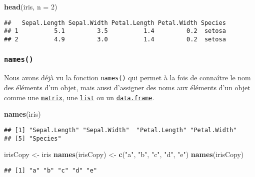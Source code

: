 \documentclass[]{book}
\newenvironment{Shaded}{\begin{snugshade}}{\end{snugshade}}
\newcommand{\KeywordTok}[1]{\textcolor[rgb]{0.13,0.29,0.53}{\textbf{#1}}}
\newcommand{\DataTypeTok}[1]{\textcolor[rgb]{0.13,0.29,0.53}{#1}}
\newcommand{\DecValTok}[1]{\textcolor[rgb]{0.00,0.00,0.81}{#1}}
\newcommand{\StringTok}[1]{\textcolor[rgb]{0.31,0.60,0.02}{#1}}
\newcommand{\NormalTok}[1]{#1}
\theoremstyle{definition}
\theoremstyle{definition}
\theoremstyle{definition}
\theoremstyle{remark}
\begin{document}
\begin{Shaded}
\begin{Highlighting}[]
\KeywordTok{head}\NormalTok{(iris, }\DataTypeTok{n =} \DecValTok{2}\NormalTok{)}
\end{Highlighting}
\end{Shaded}

\begin{verbatim}
##   Sepal.Length Sepal.Width Petal.Length Petal.Width Species
## 1          5.1         3.5          1.4         0.2  setosa
## 2          4.9         3.0          1.4         0.2  setosa
\end{verbatim}

\subsubsection{\texorpdfstring{\texttt{names()}}{names()}}\label{l015names}

Nous avons déjà vu la fonction \texttt{names()} qui permet à la fois de
connaître le nom des éléments d'un objet, mais aussi d'assigner des noms
aux éléments d'un objet comme une
\protect\hyperlink{l014matrix}{\texttt{matrix}}, une
\protect\hyperlink{l014list}{\texttt{list}} ou un
\protect\hyperlink{l014dataframe}{\texttt{data.frame}}.

\begin{Shaded}
\begin{Highlighting}[]
\KeywordTok{names}\NormalTok{(iris)}
\end{Highlighting}
\end{Shaded}

\begin{verbatim}
## [1] "Sepal.Length" "Sepal.Width"  "Petal.Length" "Petal.Width" 
## [5] "Species"
\end{verbatim}

\begin{Shaded}
\begin{Highlighting}[]
\NormalTok{irisCopy <-}\StringTok{ }\NormalTok{iris}
\KeywordTok{names}\NormalTok{(irisCopy) <-}\StringTok{ }\KeywordTok{c}\NormalTok{(}\StringTok{"a"}\NormalTok{, }\StringTok{"b"}\NormalTok{, }\StringTok{"c"}\NormalTok{, }\StringTok{"d"}\NormalTok{, }\StringTok{"e"}\NormalTok{)}
\KeywordTok{names}\NormalTok{(irisCopy)}
\end{Highlighting}
\end{Shaded}

\begin{verbatim}
## [1] "a" "b" "c" "d" "e"
\end{verbatim}
\end{document}
